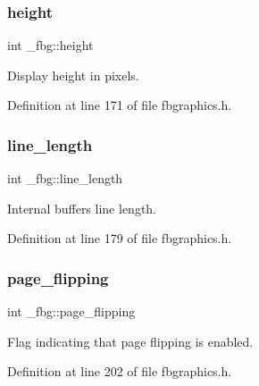 \mbox{\label{struct__fbg_a3a3bd409e71d020fa77f69a541d832f8}} 
\subsubsection{\texorpdfstring{height}{height}}
{\footnotesize\ttfamily int \+\_\+fbg\+::height}



Display height in pixels. 



Definition at line 171 of file fbgraphics.\+h.

\mbox{\label{struct__fbg_af8a1ee8d7004e6f2193f2a3ed98f8ce8}} 
\subsubsection{\texorpdfstring{line\+\_\+length}{line\_length}}
{\footnotesize\ttfamily int \+\_\+fbg\+::line\+\_\+length}



Internal buffers line length. 



Definition at line 179 of file fbgraphics.\+h.

\mbox{\label{struct__fbg_ad32509bca6ac4fb467476834cb8ce9d2}} 
\subsubsection{\texorpdfstring{page\+\_\+flipping}{page\_flipping}}
{\footnotesize\ttfamily int \+\_\+fbg\+::page\+\_\+flipping}



Flag indicating that page flipping is enabled. 



Definition at line 202 of file fbgraphics.\+h.

\mbox{\label{struct__fbg_a84fb220d4804cba22176997898e75b73}} 
